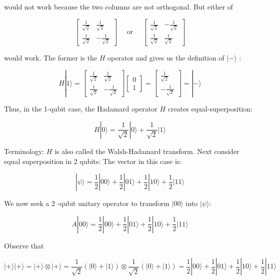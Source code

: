 \documentclass[main.tex]{subfiles}
\begin{document}
    would not work because the two columns are not orthogonal. But either of
    
    $$
    \left[\begin{array}{cc}
    \frac{1}{\sqrt{2}} & \frac{1}{\sqrt{2}} \\
    \frac{1}{\sqrt{2}} & -\frac{1}{\sqrt{2}}
    \end{array}\right] \quad \text { or } \quad\left[\begin{array}{cc}
    \frac{1}{\sqrt{2}} & -\frac{1}{\sqrt{2}} \\
    \frac{1}{\sqrt{2}} & \frac{1}{\sqrt{2}}
    \end{array}\right]
    $$
    
    would work. The former is the $H$ operator and gives us the definition of $|-\rangle$ :
    
    $$
    H|1\rangle=\left[\begin{array}{cc}
    \frac{1}{\sqrt{2}} & \frac{1}{\sqrt{2}} \\
    \frac{1}{\sqrt{2}} & -\frac{1}{\sqrt{2}}
    \end{array}\right]\left[\begin{array}{l}
    0 \\
    1
    \end{array}\right]=\left[\begin{array}{c}
    \frac{1}{\sqrt{2}} \\
    -\frac{1}{\sqrt{2}}
    \end{array}\right]=|-\rangle
    $$
    
    Thus, in the 1-qubit case, the Hadamard operator $H$ creates equal-superposition:
    
    $$
    H|0\rangle=\frac{1}{\sqrt{2}}|0\rangle+\frac{1}{\sqrt{2}}|1\rangle
    $$
    
    Terminology: $H$ is also called the Walsh-Hadamard transform. Next consider equal superposition in 2 qubits: The vector in this case is:
    
    $$
    |\psi\rangle=\frac{1}{2}|00\rangle+\frac{1}{2}|01\rangle+\frac{1}{2}|10\rangle+\frac{1}{2}|11\rangle
    $$
    
    We now seek a 2 -qubit unitary operator to transform $|00\rangle$ into $|\psi\rangle$:
    
    $$
    A|00\rangle=\frac{1}{2}|00\rangle+\frac{1}{2}|01\rangle+\frac{1}{2}|10\rangle+\frac{1}{2}|11\rangle
    $$
    
    Observe that
    
    $$
    |+\rangle|+\rangle=|+\rangle \otimes|+\rangle=\frac{1}{\sqrt{2}}(|0\rangle+|1\rangle) \otimes \frac{1}{\sqrt{2}}(|0\rangle+|1\rangle)=\frac{1}{2}|00\rangle+\frac{1}{2}|01\rangle+\frac{1}{2}|10\rangle+\frac{1}{2}|11\rangle
    $$
    
\end{document}
